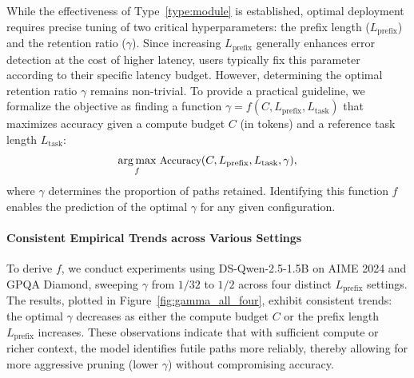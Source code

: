 \documentclass[11pt]{article}
\theoremstyle{plain}
\begin{document}
While the effectiveness of 
Type~\ref{type:module} is established, optimal deployment requires precise tuning of two critical hyperparameters: the prefix length ($L_\text{prefix}$) and the retention ratio ($\gamma$).
Since increasing $L_\text{prefix}$ generally enhances error detection at the cost of higher latency, users typically fix this parameter according to their specific latency budget.
However, determining the optimal retention ratio $\gamma$ remains non-trivial.
To provide a practical guideline, we formalize the objective as finding a function $\gamma = f(C, L_\text{prefix}, L_\text{task})$ that maximizes accuracy given a compute budget $C$ (in tokens) and a reference task length $L_\text{task}$:
\begin{equation}\small
    \underset{f}{\arg \max} \text{ Accuracy}(C,L_\text{prefix},L_\text{task},\gamma),
\end{equation}
\vspace{-2mm}
where $\gamma$ determines the proportion of paths retained.
Identifying this function $f$ enables the prediction of the optimal $\gamma$ for any given configuration.

\paragraph{Consistent Empirical Trends across Various Settings}
To derive $f$, we conduct experiments using DS-Qwen-2.5-1.5B on AIME 2024 and GPQA Diamond, sweeping $\gamma$ from $1/32$ to $1/2$ across four distinct $L_\text{prefix}$ settings.
The results, plotted in Figure~\ref{fig:gamma_all_four}, exhibit consistent trends: the optimal $\gamma$ decreases as either the compute budget $C$ or the prefix length $L_\text{prefix}$ increases.
These observations indicate that with sufficient compute or richer context, the model identifies futile paths more reliably, thereby allowing for more aggressive pruning (lower $\gamma$) without compromising accuracy.
\end{document}
